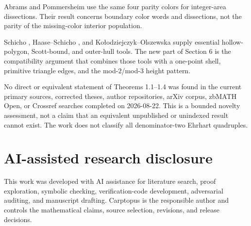 \documentclass[11pt]{article}
\theoremstyle{remark}
\numberwithin{equation}{section}
\begin{document}
Abrams and Pommersheim \cite{ref5} use the same four parity colors for integer-area dissections. Their result concerns boundary color words and dissections, not the parity of the missing-color interior population.

Schicho \cite{ref9}, Haase--Schicho \cite{ref10}, and Ko\l{}odziejczyk--Olszewska \cite{ref11} supply essential hollow-polygon, Scott-bound, and outer-hull tools. The new part of Section 6 is the compatibility argument that combines those tools with a one-point shell, primitive triangle edges, and the mod-$2$/mod-$3$ height pattern.

No direct or equivalent statement of Theorems 1.1--1.4 was found in the current primary sources, corrected theses, author repositories, arXiv corpus, zbMATH Open, or Crossref searches completed on 2026-08-22. This is a bounded novelty assessment, not a claim that an equivalent unpublished or unindexed result cannot exist. The work does not classify all denominator-two Ehrhart quadruples.

\enlargethispage{2\baselineskip}
\section{AI-assisted research disclosure}


This work was developed with AI assistance for literature search, proof exploration, symbolic checking, verification-code development, adversarial auditing, and manuscript drafting. Carptopus is the responsible author and controls the mathematical claims, source selection, revisions, and release decisions.
\end{document}
